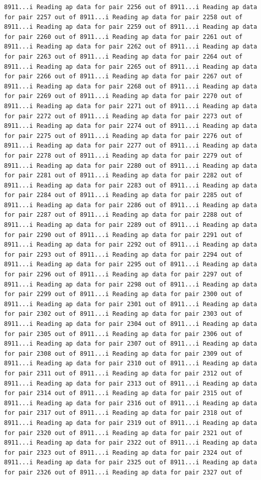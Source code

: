 \documentclass[
]{article}
\begin{document}
\begin{verbatim}
8911...i Reading ap data for pair 2256 out of 8911...i Reading ap data for pair 2257 out of 8911...i Reading ap data for pair 2258 out of 8911...i Reading ap data for pair 2259 out of 8911...i Reading ap data for pair 2260 out of 8911...i Reading ap data for pair 2261 out of 8911...i Reading ap data for pair 2262 out of 8911...i Reading ap data for pair 2263 out of 8911...i Reading ap data for pair 2264 out of 8911...i Reading ap data for pair 2265 out of 8911...i Reading ap data for pair 2266 out of 8911...i Reading ap data for pair 2267 out of 8911...i Reading ap data for pair 2268 out of 8911...i Reading ap data for pair 2269 out of 8911...i Reading ap data for pair 2270 out of 8911...i Reading ap data for pair 2271 out of 8911...i Reading ap data for pair 2272 out of 8911...i Reading ap data for pair 2273 out of 8911...i Reading ap data for pair 2274 out of 8911...i Reading ap data for pair 2275 out of 8911...i Reading ap data for pair 2276 out of 8911...i Reading ap data for pair 2277 out of 8911...i Reading ap data for pair 2278 out of 8911...i Reading ap data for pair 2279 out of 8911...i Reading ap data for pair 2280 out of 8911...i Reading ap data for pair 2281 out of 8911...i Reading ap data for pair 2282 out of 8911...i Reading ap data for pair 2283 out of 8911...i Reading ap data for pair 2284 out of 8911...i Reading ap data for pair 2285 out of 8911...i Reading ap data for pair 2286 out of 8911...i Reading ap data for pair 2287 out of 8911...i Reading ap data for pair 2288 out of 8911...i Reading ap data for pair 2289 out of 8911...i Reading ap data for pair 2290 out of 8911...i Reading ap data for pair 2291 out of 8911...i Reading ap data for pair 2292 out of 8911...i Reading ap data for pair 2293 out of 8911...i Reading ap data for pair 2294 out of 8911...i Reading ap data for pair 2295 out of 8911...i Reading ap data for pair 2296 out of 8911...i Reading ap data for pair 2297 out of 8911...i Reading ap data for pair 2298 out of 8911...i Reading ap data for pair 2299 out of 8911...i Reading ap data for pair 2300 out of 8911...i Reading ap data for pair 2301 out of 8911...i Reading ap data for pair 2302 out of 8911...i Reading ap data for pair 2303 out of 8911...i Reading ap data for pair 2304 out of 8911...i Reading ap data for pair 2305 out of 8911...i Reading ap data for pair 2306 out of 8911...i Reading ap data for pair 2307 out of 8911...i Reading ap data for pair 2308 out of 8911...i Reading ap data for pair 2309 out of 8911...i Reading ap data for pair 2310 out of 8911...i Reading ap data for pair 2311 out of 8911...i Reading ap data for pair 2312 out of 8911...i Reading ap data for pair 2313 out of 8911...i Reading ap data for pair 2314 out of 8911...i Reading ap data for pair 2315 out of 8911...i Reading ap data for pair 2316 out of 8911...i Reading ap data for pair 2317 out of 8911...i Reading ap data for pair 2318 out of 8911...i Reading ap data for pair 2319 out of 8911...i Reading ap data for pair 2320 out of 8911...i Reading ap data for pair 2321 out of 8911...i Reading ap data for pair 2322 out of 8911...i Reading ap data for pair 2323 out of 8911...i Reading ap data for pair 2324 out of 8911...i Reading ap data for pair 2325 out of 8911...i Reading ap data for pair 2326 out of 8911...i Reading ap data for pair 2327 out of 
\end{verbatim}
\end{document}

